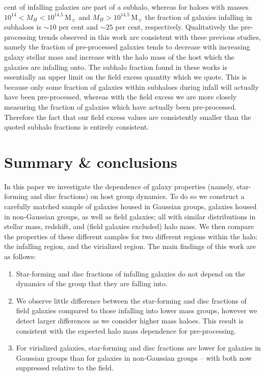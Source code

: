 \documentclass[a4paper,fleqn,usenatbib]{mnras}
\newcommand{\Msun}{\,\mathrm{M_{\sun}}}
\begin{document}
cent of infalling galaxies are part of a subhalo, whereas for haloes
with masses $10^{14} < M_H < 10^{14.5}\Msun$ and $M_H >
10^{14.5}\Msun$ the fraction of galaxies infalling in subhaloes is
$\sim 10$ per cent and $\sim 25$ per cent, respectively.
Qualitatively the pre-processing trends observed in this work are
consistent with these previous studies, namely the fraction of
pre-processed galaxies tends to decrease with increasing galaxy stellar mass and
increase with the halo mass of the host which the galaxies are
infalling onto.  The subhalo fraction found in these works is
essentially an upper limit on the field excess quantity which we
quote.  This is because only some fraction of galaxies within subhaloes
during infall will actually have been pre-processed, whereas with the
field excess we are more closely measuring the fraction of galaxies
which have actually been pre-processed.  Therefore the fact that our
field excess values are consistently smaller than the quoted subhalo
fractions is entirely consistent.


\section{Summary \& conclusions}
\label{sec:summary}

In this paper we investigate the dependence of galaxy properties
(namely, star-forming and disc fractions) on host group dynamics.  To
do so we construct a carefully matched sample of galaxies housed in
Gaussian groups, galaxies housed in non-Gaussian groups, as well as
field galaxies; all with similar distributions in stellar mass,
redshift, and (field galaxies excluded) halo mass.  We then compare
the properties of these different samples for two different regions
within the halo: the infalling region, and the virialized region.  The
main findings of this work are as follows:

\begin{enumerate}
  \item Star-forming and disc fractions of infalling galaxies do not
    depend on the dynamics of the group that they are falling into.

  \item We observe little difference between the star-forming
    and disc fractions of field galaxies compared to those infalling
    into lower mass groups, however we detect larger differences as we
    consider higher mass haloes.  This result is
    consistent with the expected halo mass dependence for pre-processing.

  \item For virialized galaxies, star-forming and disc fractions are
    lower for galaxies in Gaussian groups than for galaxies in
    non-Gaussian groups -- with both now suppressed relative to the field.
\end{enumerate}
\end{document}
